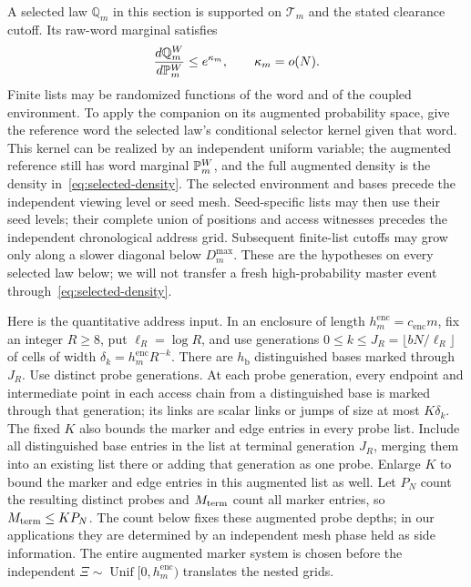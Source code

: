 A selected law \(\mathbb Q_m\) in this section is supported on
\(\mathcal T_m\) and the stated clearance cutoff.  Its raw-word
marginal satisfies
\begin{equation}
\label{eq:selected-density}
 \frac{d\mathbb Q_m^W}{d\mathbb P_m^W}\le e^{\kappa_m},
 \qquad \kappa_m=o(N).
\end{equation}
Finite lists may be randomized functions of the word and of the
coupled environment.  To apply the companion on its augmented
probability space, give the reference word the selected law's
conditional selector kernel given that word.  This kernel can be
realized by an independent uniform variable; the augmented reference
still has word marginal \(\mathbb P_m^W\), and the full augmented density
is the density in~\eqref{eq:selected-density}.  The selected environment
and bases precede the independent viewing level or seed mesh.
Seed-specific lists may then use their seed levels; their complete
union of positions and access witnesses precedes the independent
chronological address grid.  Subsequent
finite-list cutoffs may grow only along a slower diagonal below
\(D_m^{\max}\).  These are the hypotheses on every selected law
below; we will not transfer a fresh high-probability master event
through~\eqref{eq:selected-density}.

Here is the quantitative address input.  In an enclosure of length
\(h_m^{\mathrm{enc}}=c_{\mathrm{enc}}m\), fix an integer \(R\ge8\), put
\(\ell_R=\log R\), and use generations
\(0\le k\le J_R=\lfloor bN/\ell_R\rfloor\) of cells of width
\(\delta_k=h_m^{\mathrm{enc}}R^{-k}\).  There are \(h_{\mathrm b}\)
distinguished bases marked through \(J_R\).  Use distinct probe
generations.  At each probe generation,
every endpoint and intermediate point in each access chain from
a distinguished base is
marked through that generation; its links are scalar links or
jumps of size at most \(K\delta_k\).  The fixed \(K\) also bounds
the marker and edge entries in every probe list.  Include all distinguished
base entries in the list at terminal generation \(J_R\), merging
them into an existing list there or adding that generation as one
probe.  Enlarge \(K\) to bound the marker and edge entries in this
augmented list as well.  Let \(P_N\) count the resulting distinct
probes and \(M_{\rm term}\) count all marker entries, so
\(M_{\rm term}\le KP_N\).  The count below fixes these augmented
probe depths; in our applications they are determined by an
independent mesh phase held as side information.  The entire
augmented marker system is chosen before the independent
\(\Xi\sim\operatorname{Unif}[0,h_m^{\mathrm{enc}})\) translates the nested grids.

